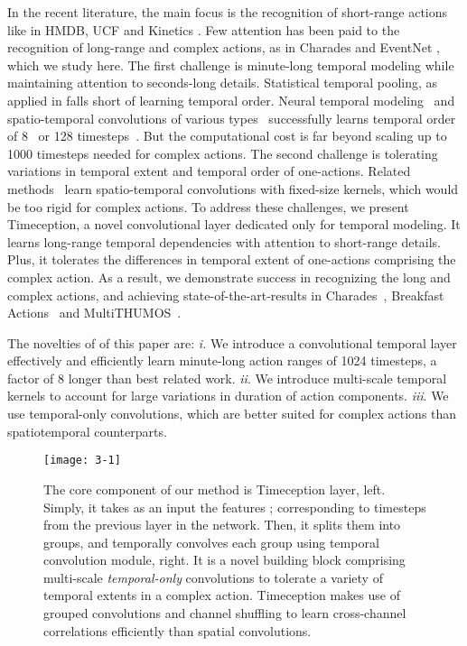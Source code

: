 \documentclass[10pt,twocolumn,letterpaper]{article}
\begin{document}
In the recent literature, the main focus is the recognition of short-range actions like in HMDB, UCF and Kinetics \cite{kuehne2011hmdb,soomro2012ucf101,kay2017kinetics}. Few attention has been paid to the recognition of long-range and complex actions, as in Charades and EventNet \cite{sigurdsson2016hollywood,ye2015eventnet}, which we study here. The first challenge is minute-long temporal modeling while maintaining attention to seconds-long details. Statistical temporal pooling, as applied in  \cite{girdhar2017attentional,miech2017learnable} falls short of learning temporal order. Neural temporal modeling~\cite{donahue2015long,girdhar2017actionvlad} and spatio-temporal convolutions of various types~\cite{ji20133d,tran2015learning, tran2018closer} successfully learns temporal order of 8~\cite{carreira2017quo} or 128 timesteps~\cite{wang2017non}. But the computational cost is far beyond scaling up to 1000 timesteps needed for complex actions. The second challenge is tolerating variations in temporal extent and temporal order of one-actions. Related methods~\cite{tran2015learning,xie2017rethinking} learn spatio-temporal convolutions with fixed-size kernels, which would be too rigid for complex actions. To address these challenges, we present Timeception, a novel convolutional layer dedicated only for temporal modeling. It learns long-range temporal dependencies with attention to short-range details. Plus, it tolerates the differences in temporal extent of one-actions comprising the complex action. As a result, we demonstrate success in recognizing the long and complex actions, and achieving state-of-the-art-results in Charades~\cite{sigurdsson2016hollywood}, Breakfast Actions~\cite{kuehne2014language} and MultiTHUMOS~\cite{yeung2018every}.

The novelties of of this paper are:
\textit{i.} We introduce a convolutional temporal layer effectively and efficiently learn minute-long action ranges of 1024 timesteps, a factor of 8 longer than best related work.
\textit{ii}. We introduce multi-scale temporal kernels to account for large variations in duration of action components.
\textit{iii}. We use temporal-only convolutions, which are better suited for complex actions than spatiotemporal counterparts.

\begin{figure*}[!ht]
\begin{center}
\texttt{[image: 3-1]}
\end{center}
\caption{The core component of our method is Timeception layer, left.
Simply, it takes as an input the features ; corresponding to  timesteps from the previous layer in the network.
Then, it splits them into  groups, and temporally convolves each group using temporal convolution module, right.
It is a novel building block comprising multi-scale \textit{temporal-only} convolutions to tolerate a variety of temporal extents in a complex action.
Timeception makes use of grouped convolutions and channel shuffling to learn cross-channel correlations efficiently than  spatial convolutions.}
\label{fig:3-1}
\vspace*{-5mm}
\end{figure*}
\end{document}
